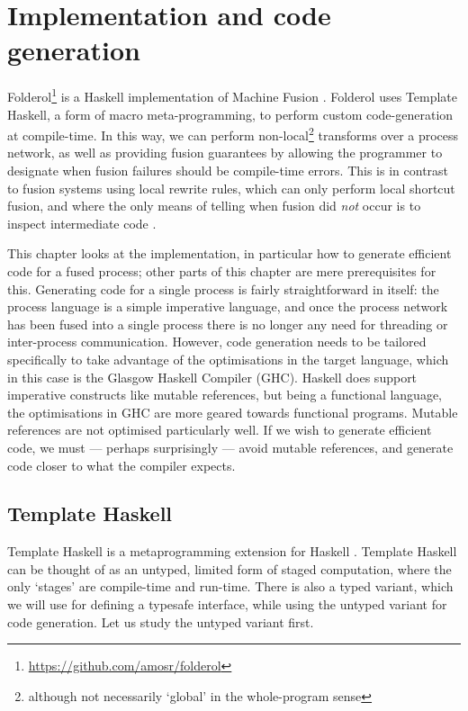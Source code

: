 \chapter{Implementation and code generation}
\label{chapter:process:implementation}


Folderol\footnote{\url{https://github.com/amosr/folderol}} is a Haskell implementation of Machine Fusion .
Folderol uses Template Haskell, a form of macro meta-programming, to perform custom code-generation at compile-time.
In this way, we can perform non-local\footnote{although not necessarily `global' in the whole-program sense} transforms over a process network, as well as providing fusion guarantees by allowing the programmer to designate when fusion failures should be compile-time errors.
This is in contrast to fusion systems using local rewrite rules, which can only perform local shortcut fusion, and where the only means of telling when fusion did \emph{not} occur is to inspect intermediate code .

This chapter looks at the implementation, in particular how to generate efficient code for a fused process; other parts of this chapter are mere prerequisites for this.
Generating code for a single process is fairly straightforward in itself: the process language is a simple imperative language, and once the process network has been fused into a single process there is no longer any need for threading or inter-process communication.
However, code generation needs to be tailored specifically to take advantage of the optimisations in the target language, which in this case is the Glasgow Haskell Compiler (GHC).
Haskell does support imperative constructs like mutable references, but being a functional language, the optimisations in GHC are more geared towards functional programs.
Mutable references are not optimised particularly well.
If we wish to generate efficient code, we must --- perhaps surprisingly --- avoid mutable references, and generate code closer to what the compiler expects.

\section{Template Haskell}
Template Haskell is a metaprogramming extension for Haskell \cite{sheard2002template}.
Template Haskell can be thought of as an untyped, limited form of staged computation, where the only `stages' are compile-time and run-time.
There is also a typed variant, which we will use for defining a typesafe interface, while using the untyped variant for code generation.
Let us study the untyped variant first.

